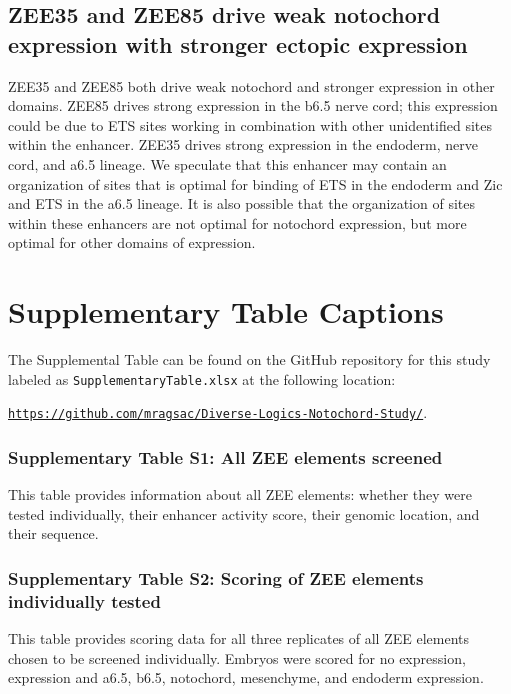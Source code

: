 \subsection{ZEE35 and ZEE85 drive weak notochord expression with stronger ectopic expression}
ZEE35 and ZEE85 both drive weak notochord and stronger expression in other domains. ZEE85 drives strong expression in the b6.5 nerve cord; this expression could be due to ETS sites working in combination with other unidentified sites within the enhancer. ZEE35 drives strong expression in the endoderm, nerve cord, and a6.5 lineage. We speculate that this enhancer may contain an organization of sites that is optimal for binding of ETS in the endoderm and Zic and ETS in the a6.5 lineage. It is also possible that the organization of sites within these enhancers are not optimal for notochord expression, but more optimal for other domains of expression.

\section{Supplementary Table Captions}

The Supplemental Table can be found on the GitHub repository for this study labeled as \verb|SupplementaryTable.xlsx| at the following location: 

\noindent \href{https://github.com/mragsac/Diverse-Logics-Notochord-Study/}{\texttt{https://github.com/mragsac/Diverse-Logics-Notochord-Study/}}.

\par\noindent\dotfill

\subsubsection{Supplementary Table S1: All ZEE elements screened}
This table provides information about all ZEE elements: whether they were tested individually, their enhancer activity score, their genomic location, and their sequence.

\subsubsection{Supplementary Table S2: Scoring of ZEE elements individually tested}
This table provides scoring data for all three replicates of all ZEE elements chosen to be screened individually. Embryos were scored for no expression, expression and a6.5, b6.5, notochord, mesenchyme, and endoderm expression.

